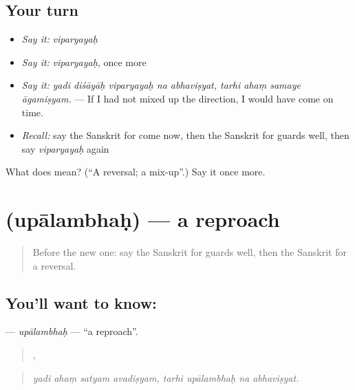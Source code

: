 \subsection*{Your turn}
\begin{itemize}
\raggedright
  \item \emph{Say it:} \emph{viparyayaḥ}
  \item \emph{Say it:} \emph{viparyayaḥ}, once more
  \item \emph{Say it:} \emph{yadi diśāyāḥ viparyayaḥ na abhaviṣyat, tarhi ahaṃ samaye āgamiṣyam.} — If I had not mixed up the direction, I would have come on time.
  \item \emph{Recall:} say the Sanskrit for come now, then the Sanskrit for guards well, then say \emph{viparyayaḥ} again
\end{itemize}

\begin{tcolorbox}[breakable,colback=teal!4,colframe=teal!35!black,title={Before you move on}]
What does  mean? (\textquotedblleft{}A reversal; a mix-up\textquotedblright{}.) Say it once more.
\end{tcolorbox}
\section[\texorpdfstring{\sk{उपालम्भः} (upālambhaḥ)}{उपालम्भः (upālambhaḥ)}]{ (upālambhaḥ) — a reproach}

\label{lesson:SA-C553-upalambhah}



\begin{quote}
Before the new one: say the Sanskrit for guards well, then the Sanskrit for a reversal.
\end{quote}

\subsection*{You'll want to know: }
\textbf{} — \emph{upālambhaḥ} — \textquotedblleft{}a reproach\textquotedblright{}.

\begin{quote}
   ,    
\end{quote}

\begin{quote}
\emph{yadi ahaṃ satyam avadiṣyam, tarhi upālambhaḥ na abhaviṣyat.}
\end{quote}

